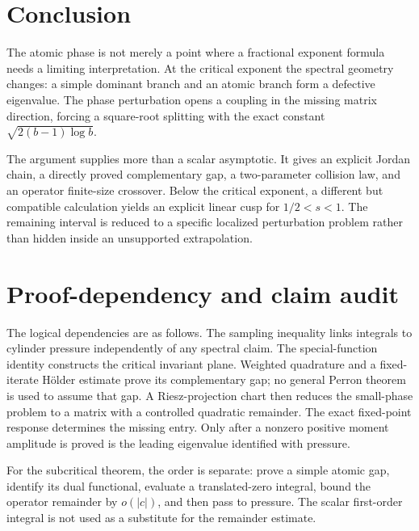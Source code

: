 \documentclass[11pt,a4paper]{article}
\numberwithin{equation}{section}
\theoremstyle{definition}
\theoremstyle{remark}
\begin{document}
\section{Conclusion}
The atomic phase is not merely a point where a fractional exponent
formula needs a limiting interpretation. At the critical exponent the
spectral geometry changes: a simple dominant branch and an atomic
branch form a defective eigenvalue. The phase perturbation opens a
coupling in the missing matrix direction, forcing a square-root
splitting with the exact constant $\sqrt{2(b-1)\log b}$.

The argument supplies more than a scalar asymptotic. It gives an explicit
Jordan chain, a directly proved complementary gap, a two-parameter
collision law, and an operator finite-size crossover. Below the critical
exponent, a different but compatible calculation yields an explicit
linear cusp for $1/2<s<1$. The remaining interval is reduced to a
specific localized perturbation problem rather than hidden inside an
unsupported extrapolation.

\appendix
\section{Proof-dependency and claim audit}
\label{app:audit}
The logical dependencies are as follows. The sampling inequality links
integrals to cylinder pressure independently of any spectral claim.
The special-function identity constructs the critical invariant plane.
Weighted quadrature and a fixed-iterate H\"older estimate prove its
complementary gap; no general Perron theorem is used to assume that gap.
A Riesz-projection chart then reduces the small-phase problem to a
matrix with a controlled quadratic remainder. The exact fixed-point
response determines the missing entry. Only after a nonzero positive
moment amplitude is proved is the leading eigenvalue identified with
pressure.

For the subcritical theorem, the order is separate: prove a simple
atomic gap, identify its dual functional, evaluate a translated-zero
integral, bound the operator remainder by $o(|c|)$, and then pass to
pressure. The scalar first-order integral is not used as a substitute
for the remainder estimate.
\end{document}
